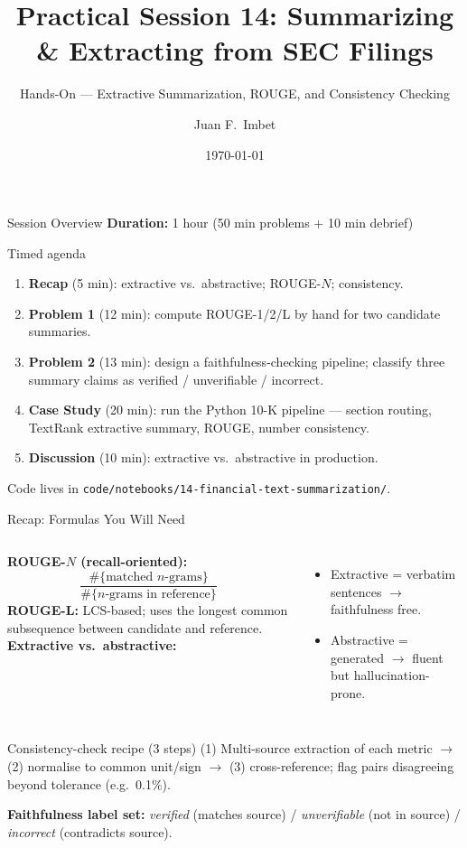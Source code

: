 \documentclass[9pt,t]{beamer}
\title{Practical Session 14: Summarizing \& Extracting from SEC Filings}
\subtitle{Hands-On --- Extractive Summarization, ROUGE, and Consistency Checking}
\author{Juan F.\ Imbet}
\institute{Paris Dauphine -- PSL University}
\date{\today}
\begin{document}
\begin{frame}\titlepage\end{frame}

\begin{frame}{Session Overview}
\textbf{Duration:} 1 hour (50 min problems + 10 min debrief)

\medskip
\begin{block}{Timed agenda}
\begin{enumerate}
  \item \textbf{Recap} (5 min): extractive vs.\ abstractive; ROUGE-$N$; consistency.
  \item \textbf{Problem 1} (12 min): compute ROUGE-1/2/L by hand for two candidate summaries.
  \item \textbf{Problem 2} (13 min): design a faithfulness-checking pipeline; classify
        three summary claims as verified / unverifiable / incorrect.
  \item \textbf{Case Study} (20 min): run the Python 10-K pipeline ---
        section routing, TextRank extractive summary, ROUGE, number consistency.
  \item \textbf{Discussion} (10 min): extractive vs.\ abstractive in production.
\end{enumerate}
\end{block}

\medskip
Code lives in \texttt{code/notebooks/14-financial-text-summarization/}.
\end{frame}

\begin{frame}{Recap: Formulas You Will Need}
\begin{columns}[T]
\textbf{ROUGE-$N$ (recall-oriented):}
\[
\frac{\#\{\text{matched } n\text{-grams}\}}{\#\{n\text{-grams in reference}\}}
\]
\textbf{ROUGE-L:} LCS-based; uses the longest common subsequence between candidate
and reference.
\textbf{Extractive vs.\ abstractive:}
\begin{itemize}
  \item Extractive = verbatim sentences $\to$ faithfulness free.
  \item Abstractive = generated $\to$ fluent but hallucination-prone.
\end{itemize}
\end{columns}

\medskip
\begin{block}{Consistency-check recipe (3 steps)}
(1) Multi-source extraction of each metric $\to$ (2) normalise to common unit/sign
$\to$ (3) cross-reference; flag pairs disagreeing beyond tolerance (e.g.\ 0.1\%).
\end{block}

\medskip
\textbf{Faithfulness label set:} \emph{verified} (matches source) /
\emph{unverifiable} (not in source) / \emph{incorrect} (contradicts source).
\end{frame}
\end{document}
